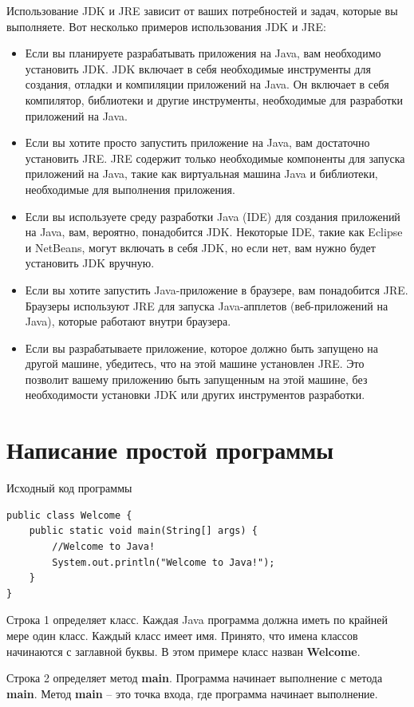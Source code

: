 Использование JDK и JRE зависит от ваших потребностей и задач, которые вы выполняете. Вот несколько примеров использования JDK и JRE:
\begin{itemize}
\item Если вы планируете разрабатывать приложения на Java, вам необходимо установить JDK. JDK включает в себя необходимые инструменты для создания, отладки и компиляции приложений на Java. Он включает в себя компилятор, библиотеки и другие инструменты, необходимые для разработки приложений на Java.
\item Если вы хотите просто запустить приложение на Java, вам достаточно установить JRE. JRE содержит только необходимые компоненты для запуска приложений на Java, такие как виртуальная машина Java и библиотеки, необходимые для выполнения приложения.
\item Если вы используете среду разработки Java (IDE) для создания приложений на Java, вам, вероятно, понадобится JDK. Некоторые IDE, такие как Eclipse и NetBeans, могут включать в себя JDK, но если нет, вам нужно будет установить JDK вручную.
\item Если вы хотите запустить Java-приложение в браузере, вам понадобится JRE. Браузеры используют JRE для запуска Java-апплетов (веб-приложений на Java), которые работают внутри браузера.
\item Если вы разрабатываете приложение, которое должно быть запущено на другой машине, убедитесь, что на этой машине установлен JRE. Это позволит вашему приложению быть запущенным на этой машине, без необходимости установки JDK или других инструментов разработки.
\end{itemize}

\section{Написание простой программы}

Исходный код программы
\begin{lstlisting}
public class Welcome {
    public static void main(String[] args) {
        //Welcome to Java!
        System.out.println("Welcome to Java!");
    }
}
\end{lstlisting}

Строка 1 определяет класс. Каждая Java программа должна иметь по крайней мере один класс. Каждый класс имеет имя. Принято, что имена классов начинаются с заглавной буквы. В этом примере класс назван \textbf{Welcome}.

Строка 2 определяет метод \textbf{main}. Программа начинает выполнение с метода \textbf{main}. Метод \textbf{main} – это точка входа, где программа начинает выполнение.

